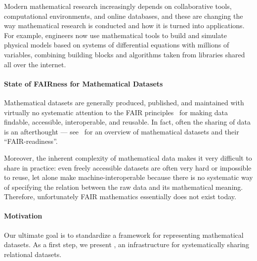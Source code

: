
Modern mathematical research increasingly depends on collaborative tools, computational environments, and online databases, and these are changing the way mathematical research is conducted and how it is turned into applications.
For example, engineers now use mathematical tools to build and simulate physical models based on systems of differential equations with millions of variables, combining building blocks and algorithms taken from libraries shared all over the internet.

\paragraph{State of FAIRness for Mathematical Datasets}
Mathematical datasets are generally produced, published, and maintained with virtually no systematic attention to the FAIR principles~\cite{FAIR,WilDumAal:FAIR16} for making data findable, accessible, interoperable, and reusable.
In fact, often the sharing of data is an afterthought --- see~\cite{Bercic:cmo:wiki} for an overview of mathematical datasets and their ``FAIR-readiness''.

Moreover, the inherent complexity of mathematical data makes it very difficult to share in practice: even freely accessible datasets are often very hard or impossible to reuse, let alone make machine-interoperable because there is no systematic way of specifying the relation between the raw data and its mathematical meaning.  Therefore, unfortunately FAIR mathematics essentially does not exist today.

\paragraph{Motivation}
Our ultimate goal is to standardize a framework for representing mathematical datasets.
As a first step, we present \dmh, an infrastructure for systematically sharing relational datasets.

